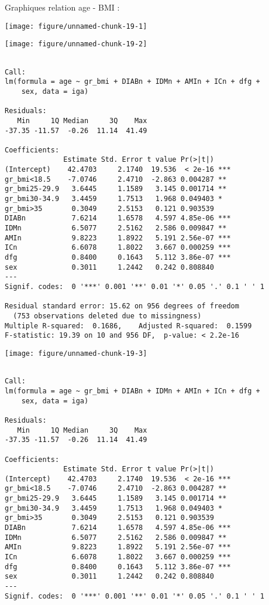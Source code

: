 \documentclass[11pt,a4paper]{article}\usepackage[]{graphicx}\usepackage[]{color}
\makeatletter
\def\maxwidth{ %
  \ifdim\Gin@nat@width>\linewidth
    \linewidth
  \else
    \Gin@nat@width
  \fi
}
\newenvironment{kframe}{%
 \def\at@end@of@kframe{}%
 \ifinner\ifhmode%
  \def\at@end@of@kframe{\end{minipage}}%
  \begin{minipage}{\columnwidth}%
 \fi\fi%
 \def\FrameCommand##1{\hskip\@totalleftmargin \hskip-\fboxsep
 \colorbox{shadecolor}{##1}\hskip-\fboxsep
     \hskip-\linewidth \hskip-\@totalleftmargin \hskip\columnwidth}%
 \MakeFramed {\advance\hsize-\width
   \@totalleftmargin\z@ \linewidth\hsize
   \@setminipage}}%
 {\par\unskip\endMakeFramed%
 \at@end@of@kframe}
\newenvironment{knitrout}{}{} %
\makeatother
\begin{document}
Graphiques relation age - BMI :

\begin{knitrout}
\color{fgcolor}
\texttt{[image: figure/unnamed-chunk-19-1]} 

\texttt{[image: figure/unnamed-chunk-19-2]} 
\begin{kframe}\begin{verbatim}

Call:
lm(formula = age ~ gr_bmi + DIABn + IDMn + AMIn + ICn + dfg + 
    sex, data = iga)

Residuals:
   Min     1Q Median     3Q    Max 
-37.35 -11.57  -0.26  11.14  41.49 

Coefficients:
              Estimate Std. Error t value Pr(>|t|)    
(Intercept)    42.4703     2.1740  19.536  < 2e-16 ***
gr_bmi<18.5    -7.0746     2.4710  -2.863 0.004287 ** 
gr_bmi25-29.9   3.6445     1.1589   3.145 0.001714 ** 
gr_bmi30-34.9   3.4459     1.7513   1.968 0.049403 *  
gr_bmi>35       0.3049     2.5153   0.121 0.903539    
DIABn           7.6214     1.6578   4.597 4.85e-06 ***
IDMn            6.5077     2.5162   2.586 0.009847 ** 
AMIn            9.8223     1.8922   5.191 2.56e-07 ***
ICn             6.6078     1.8022   3.667 0.000259 ***
dfg             0.8400     0.1643   5.112 3.86e-07 ***
sex             0.3011     1.2442   0.242 0.808840    
---
Signif. codes:  0 '***' 0.001 '**' 0.01 '*' 0.05 '.' 0.1 ' ' 1

Residual standard error: 15.62 on 956 degrees of freedom
  (753 observations deleted due to missingness)
Multiple R-squared:  0.1686,	Adjusted R-squared:  0.1599 
F-statistic: 19.39 on 10 and 956 DF,  p-value: < 2.2e-16
\end{verbatim}
\end{kframe}
\texttt{[image: figure/unnamed-chunk-19-3]} 
\begin{kframe}\begin{verbatim}

Call:
lm(formula = age ~ gr_bmi + DIABn + IDMn + AMIn + ICn + dfg + 
    sex, data = iga)

Residuals:
   Min     1Q Median     3Q    Max 
-37.35 -11.57  -0.26  11.14  41.49 

Coefficients:
              Estimate Std. Error t value Pr(>|t|)    
(Intercept)    42.4703     2.1740  19.536  < 2e-16 ***
gr_bmi<18.5    -7.0746     2.4710  -2.863 0.004287 ** 
gr_bmi25-29.9   3.6445     1.1589   3.145 0.001714 ** 
gr_bmi30-34.9   3.4459     1.7513   1.968 0.049403 *  
gr_bmi>35       0.3049     2.5153   0.121 0.903539    
DIABn           7.6214     1.6578   4.597 4.85e-06 ***
IDMn            6.5077     2.5162   2.586 0.009847 ** 
AMIn            9.8223     1.8922   5.191 2.56e-07 ***
ICn             6.6078     1.8022   3.667 0.000259 ***
dfg             0.8400     0.1643   5.112 3.86e-07 ***
sex             0.3011     1.2442   0.242 0.808840    
---
Signif. codes:  0 '***' 0.001 '**' 0.01 '*' 0.05 '.' 0.1 ' ' 1


\end{verbatim}
\end{kframe}
\end{knitrout}
\end{document}
